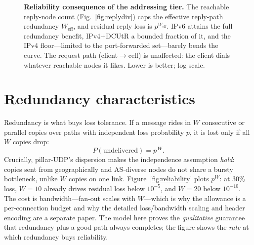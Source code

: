 \documentclass[10pt,twocolumn]{article}
\begin{document}
\begin{figure}[t]
\centering
{}
\caption{\textbf{Reliability consequence of the addressing tier.} The reachable
reply-node count (Fig.~\ref{fig:replydiv}) caps the effective reply-path
redundancy $W_{\mathrm{eff}}$, and residual reply loss is $p^{W_{\mathrm{eff}}}$.
IPv6 attains the full redundancy benefit, IPv4$+$DCUtR a bounded fraction of it,
and the IPv4 floor---limited to the port-forwarded set---barely bends the curve.
The request path (client$\to$cell) is unaffected: the client dials whatever
reachable nodes it likes. Lower is better; log scale.}
\label{fig:replyloss}
\end{figure}

\section{Redundancy characteristics}\label{sec:redundancy}
Redundancy is what buys loss tolerance. If a message rides in $W$ consecutive or
parallel copies over paths with independent loss probability $p$, it is lost
only if all $W$ copies drop:
\[
  P(\text{undelivered}) = p^{\,W}.
\]
Crucially, pillar-UDP's dispersion makes the independence assumption
\emph{hold}: copies sent from geographically and AS-diverse nodes do not share a
bursty bottleneck, unlike $W$ copies on one link. Figure~\ref{fig:reliability}
plots $p^{W}$: at $30\%$ loss, $W{=}10$ already drives residual loss below
$10^{-5}$, and $W{=}20$ below $10^{-10}$. The cost is bandwidth---fan-out scales
with $W$---which is why the allowance is a per-connection budget and why the
detailed loss/bandwidth scaling and header encoding are a separate paper. The
model here proves the \emph{qualitative} guarantee that redundancy plus a good
path always completes; the figure shows the \emph{rate} at which redundancy buys
reliability.
\end{document}
